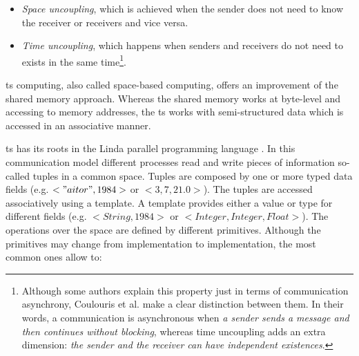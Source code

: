 \begin{itemize}
 \item \emph{Space uncoupling}, which is achieved when the sender does not need to know the receiver or receivers and vice versa.
 \item \emph{Time uncoupling}, which happens when senders and receivers do not need to exists in the same time\footnote{
	  Although some authors \cite{fensel_triple-space_2004,krummenacher_www_2005} explain this property just in terms of communication asynchrony,
	  Coulouris et al.\cite{coulouris_distributed_2012} make a clear distinction between them.
	  In their words, a communication is asynchronous when \emph{a sender sends a message and then continues without blocking},
	  whereas time uncoupling adds an extra dimension: \emph{the sender and the receiver can have independent existences}.
	  }.
 
\end{itemize}



\acl{ts} computing, also called space-based computing, offers an improvement of the shared memory approach.
Whereas the shared memory works at byte-level and accessing to memory addresses,
the \acl{ts} works with semi-structured data which is accessed in an associative manner.

\acf{ts} has its roots in the Linda parallel programming language \cite{gelernter_generative_1985}.
In this communication model different processes read and write pieces of information so-called tuples in a common space.
Tuples are composed by one or more typed data fields (e.g. $<"aitor",1984>$ or $<3,7,21.0>$).
The tuples are accessed associatively using a template.
A template provides either a value or type for different fields (e.g. $<String,1984>$ or $<Integer, Integer, Float>$).
The operations over the space are defined by different primitives.
Although the primitives may change from implementation to implementation, the most common ones allow to:

